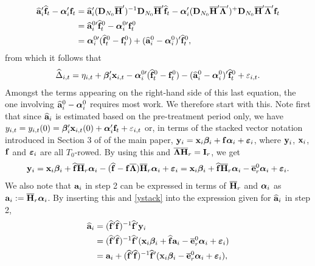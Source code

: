 \documentclass[12pt,fleqn]{article}
\begin{document}
\begin{align}
\widehat{\mathbf{a}}_i'\widehat{\mathbf{f}}_t - \boldsymbol{\alpha}_i'\mathbf{f}_t &= \widehat{\mathbf{a}}_i'(\mathbf{D}_{N_0}\overline{\mathbf{H}}')^{-1}\mathbf{D}_{N_0}\overline{\mathbf{H}}'\widehat{\mathbf{f}}_t - \boldsymbol{\alpha}_i'(\mathbf{D}_{N_0}\overline{\mathbf{H}}'\overline{\boldsymbol{\Lambda}}')^+\mathbf{D}_{N_0}\overline{\mathbf{H}}'\overline{\boldsymbol{\Lambda}}'\mathbf{f}_t \notag\\
& = \widehat{\mathbf{a}}_i^{0\prime}\widehat{\mathbf{f}}_t^0 - \boldsymbol{\alpha}_i^{0\prime}\mathbf{f}_t^0 \notag\\
& = \boldsymbol{\alpha}_i^{0\prime}(\widehat{\mathbf{f}}_t^0-\mathbf{f}_t^0) + (\widehat{\mathbf{a}}_i^{0} - \boldsymbol{\alpha}_i^0)'\widehat{\mathbf{f}}_t^0,
\end{align}
from which it follows that
\begin{align}
\widehat \Delta_{i,t}  = \eta_{i,t} + \boldsymbol{\beta}_i'\mathbf{x}_{i,t}  - \boldsymbol{\alpha}_i^{0\prime}(\widehat{\mathbf{f}}_t^0-\mathbf{f}_t^0) - (\widehat{\mathbf{a}}_i^{0} - \boldsymbol{\alpha}_i^0)'\widehat{\mathbf{f}}_t^0 + \varepsilon_{i,t}.
\end{align}
Amongst the terms appearing on the right-hand side of this last equation, the one involving $\widehat{\mathbf{a}}_i^0 - \boldsymbol{\alpha}_i^0$ requires most work. We therefore start with this. Note first that since $\widehat{\mathbf{a}}_i$ is estimated based on the pre-treatment period only, we have $y_{i,t} = y_{i,t}(0) = \boldsymbol{\beta}_i'\mathbf{x}_{i,t}(0) +  \boldsymbol{\alpha}_i'\mathbf{f}_t + \varepsilon_{i,t}$ or, in terms of the stacked vector notation introduced in Section 3 of of the main paper, $\mathbf{y}_{i}= \mathbf{x}_{i}\boldsymbol{\beta}_i + \mathbf{f}\boldsymbol{\alpha}_i+  \boldsymbol{\varepsilon}_{i}$, where $\mathbf{y}_{i}$, $\mathbf{x}_{i}$, $\mathbf{f}$ and $\boldsymbol{\varepsilon}_{i}$ are all $T_0$-rowed. By using this and $\overline{\boldsymbol{\Lambda}}\overline{\mathbf{H}}_{r} = \mathbf{I}_{r}$, we get
\begin{eqnarray}
\mathbf{y}_{i}= \mathbf{x}_{i}\boldsymbol{\beta}_i + \widehat{\mathbf{f}}\overline{\mathbf{H}}_{r}\boldsymbol{\alpha}_i - (\widehat{\mathbf{f}} - \mathbf{f}\overline{\boldsymbol{\Lambda}})\overline{\mathbf{H}}_{r}\boldsymbol{\alpha}_i+  \boldsymbol{\varepsilon}_{i}  = \mathbf{x}_{i}\boldsymbol{\beta}_i + \widehat{\mathbf{f}} \overline{\mathbf{H}}_{r}\boldsymbol{\alpha}_i - \overline{\mathbf{e}}_{r}^0\boldsymbol{\alpha}_i +  \boldsymbol{\varepsilon}_{i}. \label{ystack}
\end{eqnarray}
We also note that $\mathbf{a}_i$ in step 2 can be expressed in terms of $\overline{\mathbf{H}}_{r}$ and $\boldsymbol{\alpha}_i$ as $\mathbf{a}_i := \overline{\mathbf{H}}_{r}\boldsymbol{\alpha}_i$. By inserting this and \eqref{ystack} into the expression given for $\widehat{\mathbf{a}}_i$ in step 2,
\begin{align}
\widehat{\mathbf{a}}_i &= (\widehat{\mathbf{f}}'\widehat{\mathbf{f}})^{-1}\widehat{\mathbf{f}}'\mathbf{y}_{i} \notag\\
& = (\widehat{\mathbf{f}}'\widehat{\mathbf{f}})^{-1}\widehat{\mathbf{f}}'(\mathbf{x}_{i}\boldsymbol{\beta}_i + \widehat{\mathbf{f}} \mathbf{a}_i - \overline{\mathbf{e}}_{r}^0\boldsymbol{\alpha}_i +  \boldsymbol{\varepsilon}_{i}) \notag\\
& =  \mathbf{a}_i + (\widehat{\mathbf{f}}'\widehat{\mathbf{f}})^{-1}\widehat{\mathbf{f}}'(\mathbf{x}_{i}\boldsymbol{\beta}_i  - \overline{\mathbf{e}}_{r}^0\boldsymbol{\alpha}_i +  \boldsymbol{\varepsilon}_{i} ),
\end{align}
\end{document}
